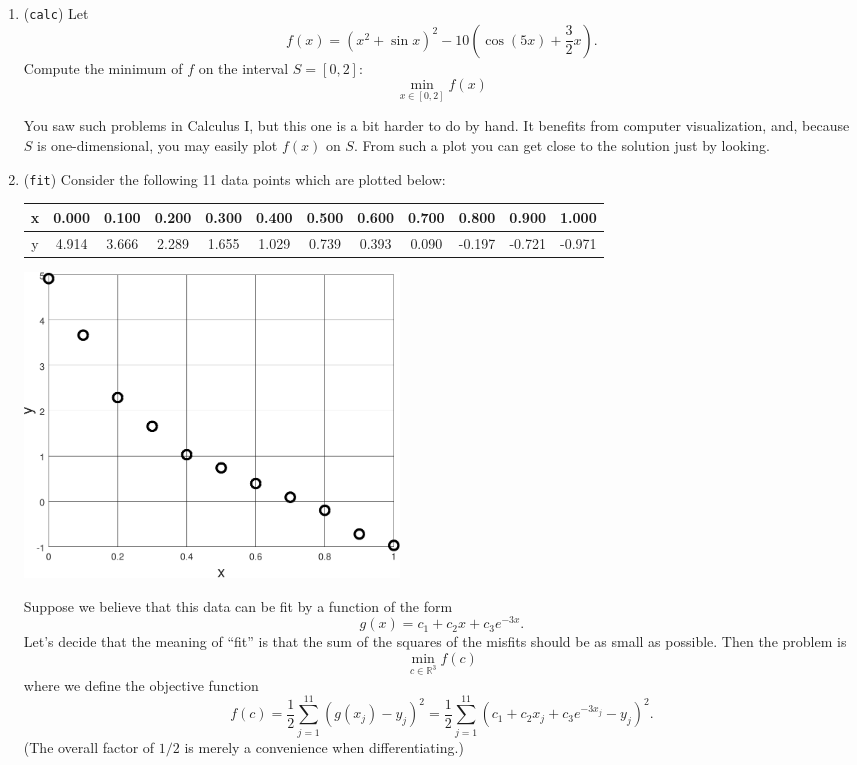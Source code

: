 \documentclass[11pt]{amsart}
\newcommand{\RR}{\mathbb{R}}
\begin{document}
\bigskip
\renewcommand{\labelenumi}{\arabic{enumi}. \quad}
\begin{enumerate}
\item (\texttt{calc})  \quad Let
    $$f(x) = \left(x^2 + \sin x\right)^2 - 10 \left(\cos(5 x) + \frac{3}{2} x\right).$$
Compute the minimum of $f$ on the interval $S=[0,2]$:
    $$\min_{x\in [0,2]} f(x)$$

You saw such problems in Calculus I, but this one is a bit harder to do by hand.  It benefits from computer visualization, and, because $S$ is one-dimensional, you may easily plot $f(x)$ on $S$.  From such a plot you can get close to the solution just by looking.


\bigskip
\item (\texttt{fit})  \quad Consider the following 11 data points which are plotted below:

\bigskip
\begin{tabular}{c|ccccccccccc}
x & 0.000 & 0.100 & 0.200 & 0.300 & 0.400 & 0.500 & 0.600 & 0.700 &  0.800 &  0.900 &  1.000 \\
\hline
y & 4.914 & 3.666 & 2.289 & 1.655 & 1.029 & 0.739 & 0.393 & 0.090 & -0.197 & -0.721 & -0.971
\end{tabular}

\bigskip
\begin{center}
\includegraphics[width=0.45\textwidth]{fitdata}
\end{center}

\medskip
Suppose we believe that this data can be fit by a function of the form
    $$g(x) = c_1 + c_2 x + c_3 e^{-3 x}.$$
Let's decide that the meaning of ``fit'' is that the sum of the squares of the misfits should be as small as possible.  Then the problem is
	$$\min_{c \in \RR^3} f(c)$$
where we define the objective function 
	$$f(c) = \frac{1}{2} \sum_{j=1}^{11} \left(g(x_j) - y_j\right)^2 = \frac{1}{2} \sum_{j=1}^{11} \left(c_1 + c_2 x_j + c_3 e^{-3 x_j} - y_j\right)^2.$$
(The overall factor of $1/2$ is merely a convenience when differentiating.)


\end{enumerate}
\end{document}
